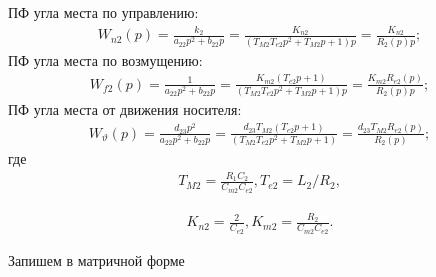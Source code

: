 ПФ угла места по управлению:
\begin{equation}
\label{eq:p4:s3.7}
\begin{multlined}
W_{n2}(p) = \frac{k_{2}}{a_{22}p^{2}+b_{22}p} = 
\frac{K_{n2}}{(T_{M2} T_{e2} p^2 + T_{M2} p +1)p} = 
\frac{K_{n2}}{R_2(p)p};
\end{multlined}
\end{equation}
ПФ угла места по возмущению:
\begin{equation}
\label{eq:p4:s3.8}
\begin{multlined}
W_{f2}(p) = \frac{1}{a_{22}p^{2}+b_{22}p} =  
\frac{K_{m2}(T_{e2} p + 1)}{(T_{M2} T_{e2} p^2 + T_{M2} p +1)p} = 
\frac{K_{m2}R_{e2}(p)}{R_2(p)p};
\end{multlined}
\end{equation}
ПФ угла места от движения носителя:
\begin{equation}
\label{eq:p4:s3.9}
\begin{multlined}
W_{\vartheta}(p) = \frac{d_{23} p^2}{a_{22}p^{2}+b_{22}p} = 
\frac{d_{23} T_{M2}(T_{e2} p + 1)}{(T_{M2} T_{e2} p^2 + T_{M2} p +1)} = 
\frac{d_{23} T_{M2}R_{e2}(p)}{R_2(p)};
\end{multlined}
\end{equation}
где 
\begin{equation}
\label{eq:p4:tt2}
\begin{aligned}
T_{M2} =\frac{R_1 C_2}{C_{m2}C_{e2}},
T_{e2} = L_2/R_2,
\end{aligned}
\end{equation}

\begin{equation}
\label{eq:p4:kk2}
\begin{aligned}
K_{n2}=\frac{2}{C_{e2}},
K_{m2}= \frac{R_2}{C_{m2}C_{e2}}.
\end{aligned}
\end{equation}

Запишем в матричной форме

